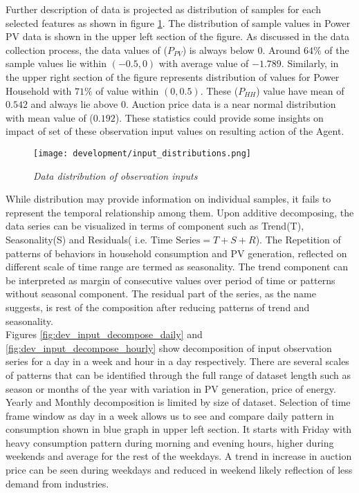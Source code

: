 \begin{large}
Further description of data is projected as distribution of samples for each selected features as shown in figure \ref{fig:dev_datainfo}. The distribution of sample values in Power PV data is shown in the upper left section of the figure. As discussed in the data collection process\cite{dataset}, the data values of ($P_{PV}$) is always below $0$. Around $64\%$ of the sample values lie within $(-0.5, 0)$ with average value of $-1.789$. Similarly, in the upper right section of the figure represents distribution of values for Power Household with $71\%$ of value within $(0, 0.5)$. These ($P_{HH}$) value have mean of $0.542$ and always lie above $0$. Auction price data is a near normal distribution with mean value of ($0.192$). These statistics could provide some insights on impact of set of these observation input values on resulting action of the Agent. \\


\begin{figure}[h]
	\begin{center}
		\texttt{[image: development/input\_distributions.png]}
		\caption{ \textit{Data distribution of observation inputs} }
		\label{fig:dev_datainfo}
	\end{center}
\end{figure}

While distribution may provide information on individual samples, it fails to represent the temporal relationship among them. Upon additive decomposing, the data series can be visualized in terms of component such as Trend(T), Seasonality(S) and Residuals( i.e. $\text{Time Series}=T+S+R$). The Repetition of patterns of behaviors in household consumption and PV generation, reflected on different scale of time range are termed as seasonality. The trend component can be interpreted as margin of consecutive values over period of time or patterns without seasonal component. The residual part of the series, as the name suggests, is rest of the composition after reducing patterns of trend and seasonality. \\

Figures \ref{fig:dev_input_decompose_daily} and \ref{fig:dev_input_decompose_hourly} show decomposition of input observation series for a day in a week and hour in a day respectively. There are several scales of patterns that can be identified through the full range of dataset length such as season or months of the year with variation in PV generation, price of energy. Yearly and Monthly decomposition is limited by size of dataset. Selection of time frame window as day in a week allows us to see and compare daily pattern in consumption shown in blue graph in upper left section. It starts with Friday with heavy consumption pattern during morning and evening hours, higher during weekends and average for the rest of the weekdays. A trend in increase in auction price can be seen during weekdays and reduced in weekend likely reflection of less demand from industries.  \\


\end{large}
